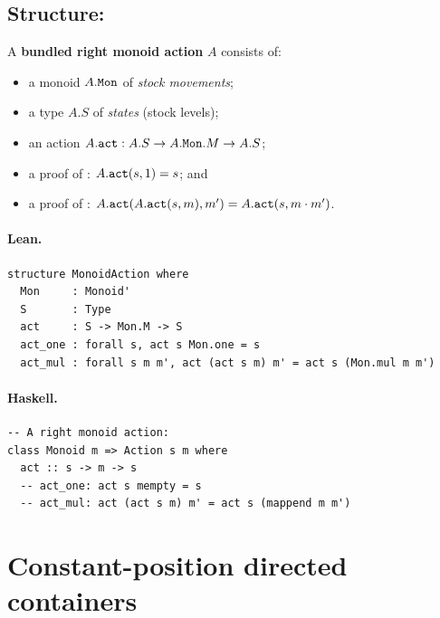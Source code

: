 \documentclass[11pt,a4paper]{article}
\begin{document}
\subsection{Structure: }

\begin{defn}
A \textbf{bundled right monoid action} $A$ consists of:
\begin{itemize}
  \item a monoid $A.\texttt{Mon}$ of \emph{stock movements};
  \item a type $A.S$ of \emph{states} (stock levels);
  \item an action $A.\texttt{act} : A.S \to A.\texttt{Mon}.M \to A.S$;
  \item a proof of : $A.\texttt{act}(s, 1) = s$; and
  \item a proof of : $A.\texttt{act}(A.\texttt{act}(s, m), m') =
    A.\texttt{act}(s, m \cdot m')$.
\end{itemize}
\end{defn}

\paragraph{Lean.}
\begin{lstlisting}[style=lean]
structure MonoidAction where
  Mon     : Monoid'
  S       : Type
  act     : S -> Mon.M -> S
  act_one : forall s, act s Mon.one = s
  act_mul : forall s m m', act (act s m) m' = act s (Mon.mul m m')
\end{lstlisting}

\paragraph{Haskell.}
\begin{lstlisting}[style=haskell]
-- A right monoid action:
class Monoid m => Action s m where
  act :: s -> m -> s
  -- act_one: act s mempty = s
  -- act_mul: act (act s m) m' = act s (mappend m m')
\end{lstlisting}


\section{Constant-position directed containers}
\end{document}
